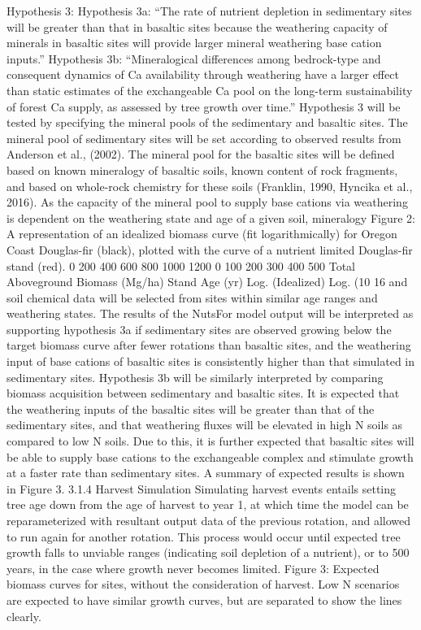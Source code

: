 \documentclass{article}
\begin{document}
Hypothesis 3:
Hypothesis 3a: “The rate of nutrient depletion in sedimentary sites will be greater than that in
basaltic sites because the weathering capacity of minerals in basaltic sites will provide larger
mineral weathering base cation inputs.”
Hypothesis 3b: “Mineralogical differences among bedrock-type and consequent dynamics of Ca
availability through weathering have a larger effect than static estimates of the exchangeable Ca
pool on the long-term sustainability of forest Ca supply, as assessed by tree growth over time.”
Hypothesis 3 will be tested by specifying the mineral pools of the sedimentary and basaltic sites.
The mineral pool of sedimentary sites will be set according to observed results from Anderson et
al., (2002). The mineral pool for the basaltic sites will be defined based on known mineralogy of
basaltic soils, known content of rock fragments, and based on whole-rock chemistry for these
soils (Franklin, 1990, Hyncika et al., 2016). As the capacity of the mineral pool to supply base
cations via weathering is dependent on the weathering state and age of a given soil, mineralogy
Figure 2: A representation of an idealized biomass curve (fit
logarithmically) for Oregon Coast Douglas-fir (black), plotted with the
curve of a nutrient limited Douglas-fir stand (red).
0
200
400
600
800
1000
1200
0 100 200 300 400 500
Total Aboveground Biomass (Mg/ha)
Stand Age (yr)
Log. (Idealized) Log. (10%
16
and soil chemical data will be selected from sites within similar age ranges and weathering
states.
The results of the NutsFor model output will be interpreted as supporting hypothesis 3a if
sedimentary sites are observed growing below the target biomass curve after fewer rotations than
basaltic sites, and the weathering input of base cations of basaltic sites is consistently higher than
that simulated in sedimentary sites. Hypothesis 3b will be similarly interpreted by comparing
biomass acquisition between sedimentary and basaltic sites. It is expected that the weathering
inputs of the basaltic sites will be greater than that of the sedimentary sites, and that weathering
fluxes will be elevated in high N soils as compared to low N soils. Due to this, it is further
expected that basaltic sites will be able to supply base cations to the exchangeable complex and
stimulate growth at a faster rate than sedimentary sites.
A summary of expected results is shown in Figure 3.
3.1.4 Harvest Simulation
Simulating harvest events entails setting tree age down from the age of harvest to year 1, at
which time the model can be reparameterized with resultant output data of the previous rotation,
and allowed to run again for another rotation. This process would occur until expected tree
growth falls to unviable ranges (indicating soil depletion of a nutrient), or to 500 years, in the
case where growth never becomes limited.
Figure 3: Expected biomass curves for sites, without the consideration of
harvest. Low N scenarios are expected to have similar growth curves, but are
separated to show the lines clearly.
\end{document}
